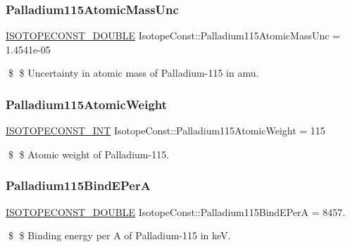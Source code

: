 \subsubsection{\texorpdfstring{Palladium115\+Atomic\+Mass\+Unc}{Palladium115AtomicMassUnc}}
{\footnotesize\ttfamily \mbox{\hyperlink{group___isotope_const-_macros_ga8f45a7272ce02c0b4c65c44636ed719a}{I\+S\+O\+T\+O\+P\+E\+C\+O\+N\+S\+T\+\_\+\+D\+O\+U\+B\+LE}} Isotope\+Const\+::\+Palladium115\+Atomic\+Mass\+Unc = 1.\+4541e-\/05}

\$ \$ Uncertainty in atomic mass of Palladium-\/115 in amu. \mbox{\label{group___isotope_const-_palladium-_pd115_gad5930dedb01efd71dc91b7cc0858603d}} 
\subsubsection{\texorpdfstring{Palladium115\+Atomic\+Weight}{Palladium115AtomicWeight}}
{\footnotesize\ttfamily \mbox{\hyperlink{group___isotope_const-_macros_ga5f18360b3e99483a35c32d789e62621c}{I\+S\+O\+T\+O\+P\+E\+C\+O\+N\+S\+T\+\_\+\+I\+NT}} Isotope\+Const\+::\+Palladium115\+Atomic\+Weight = 115}

\$ \$ Atomic weight of Palladium-\/115. \mbox{\label{group___isotope_const-_palladium-_pd115_gac4741e1e8f3a8c9a393b36ab8017c527}} 
\subsubsection{\texorpdfstring{Palladium115\+Bind\+E\+PerA}{Palladium115BindEPerA}}
{\footnotesize\ttfamily \mbox{\hyperlink{group___isotope_const-_macros_ga8f45a7272ce02c0b4c65c44636ed719a}{I\+S\+O\+T\+O\+P\+E\+C\+O\+N\+S\+T\+\_\+\+D\+O\+U\+B\+LE}} Isotope\+Const\+::\+Palladium115\+Bind\+E\+PerA = 8457.}

\$ \$ Binding energy per A of Palladium-\/115 in keV. \mbox{\label{group___isotope_const-_palladium-_pd115_ga87f261fa0f390cc2a23954f1e34c1952}} 
